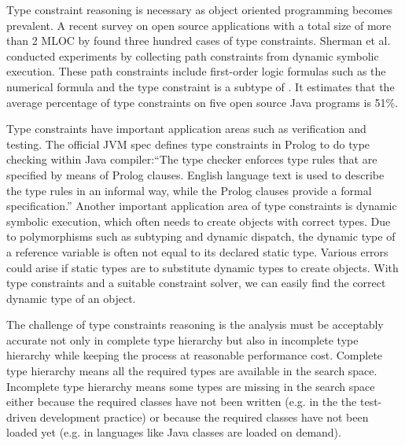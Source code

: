 Type constraint reasoning is necessary as object oriented programming becomes prevalent.  A recent survey on open source applications with a total size of more than 2 MLOC by \cite{Islam14Generating} found three hundred cases of type constraints. Sherman et al. \cite{Sherman:2015:DTP:2776776.2755971} conducted experiments by collecting path constraints from dynamic symbolic execution. These path constraints include first-order logic formulas such as the numerical formula  and the type constraint  is a subtype of . It estimates that the average percentage of type constraints on five open source Java programs is 51\%.  

Type constraints have important application areas such as verification and testing. The official JVM spec \cite{Lindholm:2014:JVM:2636992} defines type constraints in Prolog to do type checking within Java compiler:``The type checker enforces type rules that are specified by means of Prolog clauses. English language text is used to describe the type rules in an informal way, while the Prolog clauses provide a formal specification.'' Another important application area of type constraints is dynamic symbolic execution, which often needs to create objects with correct types. Due to polymorphisms such as subtyping and dynamic dispatch, the dynamic type of a reference variable is often not equal to its declared static type. Various errors could arise if static types are to substitute dynamic types to create objects. With type constraints and a suitable constraint solver, we can easily find the correct dynamic type of an object. 

The challenge of type constraints reasoning is the analysis must be acceptably accurate not only in complete type hierarchy but also in incomplete type hierarchy while keeping the process at reasonable performance cost. Complete type hierarchy means all the required types are available in the search space. Incomplete type hierarchy means some types are missing in the search space either because the required classes have not been written (e.g. in the the test-driven development practice) or because the required classes have not been loaded yet (e.g. in languages like Java classes are loaded on demand).  

